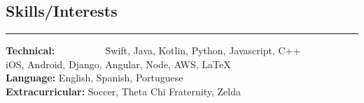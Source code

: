 \documentclass{res}
\begin{document}
\begin{resume}
\section{{\large Skills/Interests}}

\vspace{-10pt}

\noindent\rule{\resumewidth}{0.4pt}  

\vspace{-15pt}

\begin{tabbing}
{\bf Technical: } ~~~~~~~~~ \= Swift, Java, Kotlin, Python, Javascript, C++  \\
\>  iOS, Android, Django, Angular, Node, AWS, \LaTeX \\
{\bf Language: } \> English, Spanish, Portuguese\\
{\bf Extracurricular: } \> Soccer, Theta Chi Fraternity, Zelda \\
\end{tabbing}

\end{resume} 
\end{document}
